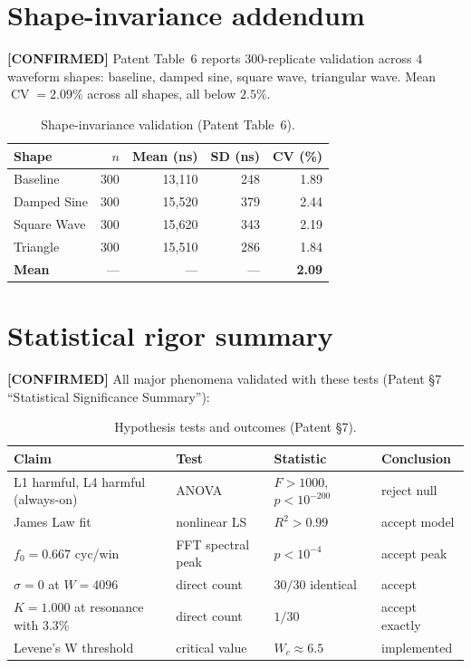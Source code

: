 \documentclass[11pt,letterpaper,openany]{book}
\theoremstyle{definition}
\theoremstyle{plain}
\newcommand{\confirmed}{\textcolor{green!50!black}{\textbf{[CONFIRMED]}}\xspace}
\newcommand{\CV}{\operatorname{CV}}
\begin{document}
\section{Shape-invariance addendum}

\confirmed Patent Table~6 reports $300$-replicate validation across
$4$ waveform shapes: baseline, damped sine, square wave, triangular wave.
Mean $\CV = 2.09\%$ across all shapes, all below $2.5\%$.

\begin{table}[H]
  \centering\small
  \begin{tabular}{l r r r r}
    \toprule
    Shape       & $n$ & Mean (ns) & SD (ns) & CV (\%) \\
    \midrule
    Baseline    & 300 & 13{,}110 & 248 & 1.89 \\
    Damped Sine & 300 & 15{,}520 & 379 & 2.44 \\
    Square Wave & 300 & 15{,}620 & 343 & 2.19 \\
    Triangle    & 300 & 15{,}510 & 286 & 1.84 \\
    \midrule
    \textbf{Mean} & --- & --- & --- & \textbf{2.09} \\
    \bottomrule
  \end{tabular}
  \caption{Shape-invariance validation (Patent Table~6).}
\end{table}

\section{Statistical rigor summary}

\confirmed All major phenomena validated with these tests
(Patent \S7 ``Statistical Significance Summary''):

\begin{table}[H]
  \centering\small
  \begin{tabular}{l l l l}
    \toprule
    Claim & Test & Statistic & Conclusion \\
    \midrule
    L1 harmful, L4 harmful (always-on) & ANOVA & $F>1000$, $p<10^{-200}$ & reject null \\
    James Law fit                       & nonlinear LS & $R^2 > 0.99$    & accept model \\
    $f_0 = 0.667$ cyc/win               & FFT spectral peak & $p<10^{-4}$ & accept peak \\
    $\sigma=0$ at $W=4096$              & direct count & $30/30$ identical & accept \\
    $K=1.000$ at resonance with $3.3\%$ & direct count & $1/30$         & accept exactly \\
    Levene's W threshold                & critical value & $W_c \approx 6.5$ & implemented \\
    \bottomrule
  \end{tabular}
  \caption{Hypothesis tests and outcomes (Patent \S7).}
\end{table}
\end{document}
